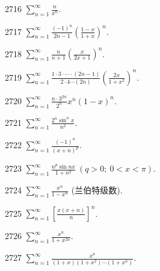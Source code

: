 

\begin{prob}[S]{2716}
$\sum_{n=1}^{\infty} \frac{n}{x^n}$.
\end{prob}

\begin{prob}[S]{2717}
$\sum_{n=1}^{\infty} \frac{(-1)^n}{2n-1}\left(\frac{1-x}{1+x}\right)^n$.
\end{prob}

\begin{prob}[S]{2718}
$\sum_{n=1}^{\infty} \frac{n}{n+1}\left(\frac{x}{2x+1}\right)^n$.
\end{prob}

\begin{prob}[S]{2719}
$\sum_{n=1}^{\infty} \frac{1\cdot 3\cdot\cdots\cdot (2n-1)}{2\cdot 4\cdots (2n)}\left(\frac{2x}{1+x^2}\right)^n$.
\end{prob}

\begin{prob}[S]{2720}
$\sum_{n=1}^{\infty} \frac{n\cdot 3^{2n}}{2^n}x^n(1-x)^n$.
\end{prob}

\begin{prob}[S]{2721}
$\sum_{n=1}^{\infty} \frac{2^n \sin^n x}{n^2}$.
\end{prob}

\begin{prob}[S]{2722}
$\sum_{n=1}^{\infty} \frac{(-1)^n}{(x+n)^p}$.
\end{prob}

\begin{prob}[S]{2723}
$\sum_{n=1}^{\infty} \frac{n^p \sin nx}{1+n^q} \ (q > 0;\ 0 < x < \pi)$.
\end{prob}

\begin{prob}[S]{2724}
$\sum_{n=1}^{\infty} \frac{x^n}{1-x^n}$ (兰伯特级数).
\end{prob}

\begin{prob}[S]{2725}
$\sum_{n=1}^{\infty} \left[\frac{x(x+n)}{n}\right]^n$.
\end{prob}

\begin{prob}[S]{2726}
$\sum_{n=1}^{\infty} \frac{x^n}{1+x^{2n}}$.
\end{prob}

\begin{prob}[S]{2727}
$\sum_{n=1}^{\infty} \frac{x^n}{(1+x)(1+x^2)\cdots (1+x^n)}$.
\end{prob}

